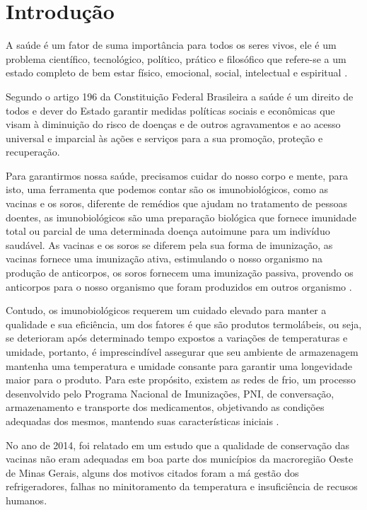 \chapter[Introdução]{Introdução}
\label{cap:intro}

A saúde é um fator de suma importância para todos os seres vivos, ele é um problema científico, tecnológico, político, prático e filosófico que refere-se a um estado completo de bem estar físico, emocional, social, intelectual e espiritual \cite{almeida2011saude}. 

Segundo o artigo 196 \cite{de2013direito} da Constituição Federal Brasileira a saúde é um direito de todos e dever do Estado garantir medidas políticas sociais e econômicas que visam à diminuição do risco de doenças e de outros agravamentos e ao acesso universal e imparcial às ações e serviços para a sua promoção, proteção e recuperação.

Para garantirmos nossa saúde, precisamos cuidar do nosso corpo e mente, para isto, uma ferramenta que podemos contar são os imunobiológicos, como as vacinas e os soros, diferente de remédios que ajudam no tratamento de pessoas doentes, as imunobiológicos são uma preparação biológica que fornece imunidade total ou parcial de uma determinada doença autoimune para um indivíduo saudável. As vacinas e os soros se diferem pela sua forma de imunização, as vacinas fornece uma imunização ativa, estimulando o nosso organismo na produção de anticorpos, os soros fornecem uma imunização passiva, provendo os anticorpos para o nosso organismo que foram produzidos  em outros organismo \cite{soma2018tratamento}.

Contudo, os imunobiológicos requerem um cuidado elevado para manter a qualidade e sua eficiência, um dos fatores é que são produtos termolábeis, ou seja, se deterioram após determinado tempo expostos a variações de temperaturas e umidade, portanto, é imprescindível assegurar que seu ambiente de armazenagem mantenha uma temperatura e umidade consante \cite{ministerio2001manual} para garantir uma longevidade maior para o produto. Para este propósito, existem as redes de frio, um processo desenvolvido pelo Programa Nacional de Imunizações, PNI, de conversação, armazenamento e transporte dos medicamentos, objetivando as condições adequadas dos mesmos, mantendo suas características iniciais \cite{ministerio2001manual}.

No ano de 2014, foi relatado em um estudo \cite{oliveira2014avaliaccao} que a qualidade de conservação das vacinas não eram adequadas em boa parte dos municípios da macroregião Oeste de Minas Gerais, alguns dos motivos citados foram a má gestão dos refrigeradores, falhas no minitoramento da temperatura e insuficiência de recusos humanos.



